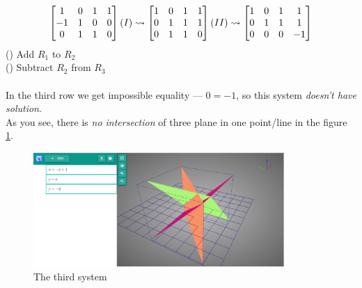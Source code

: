 \documentclass[14pt, letterpaper, fleqn]{extarticle}
\newcommand{\RomanNumeralCaps}[1]
    {\MakeUppercase{\romannumeral #1}}
\begin{document}
\begin{enumerate}
		\begin{equation*}
	      	\begin{split}
	      		\begin{bmatrix}
		      		1 & 0  & 1 & 1 \\
		      		-1 & 1  & 0 & 0 \\
		      		0 & 1 & 1 & 0
	      		\end{bmatrix}
	      		(\RomanNumeralCaps{1}) \leadsto
	      		\begin{bmatrix}
		      		1 & 0  & 1 & 1 \\
		      		0 & 1  & 1 & 1 \\
		      		0 & 1 & 1 & 0
	      		\end{bmatrix}
	      		(\RomanNumeralCaps{2}) \leadsto
	      		\begin{bmatrix}
		      		1 & 0  & 1 & 1 \\
		      		0 & 1  & 1 & 1 \\
		      		0 & 0 & 0 & -1
	      		\end{bmatrix}
	      	\end{split}
	      \end{equation*}
	      (\RomanNumeralCaps{1}) Add $R_1$ to $R_2$ \\
	      (\RomanNumeralCaps{2}) Subtract $R_2$ from $R_3$ \\\\
		In the third row we get impossible equality --- $0 = -1$, so this system \textit{doesn't have solution}.\\
		As you see, there is \textit{no intersection} of three plane in one point/line in the figure \ref{fig:system3}.
		\begin{figure}[H]
      		\centering
      		\includegraphics[width=0.85\textwidth]{system3}
      		\caption{The third system}
      		\label{fig:system3}
	      \end{figure}
\end{enumerate}
\end{document}
